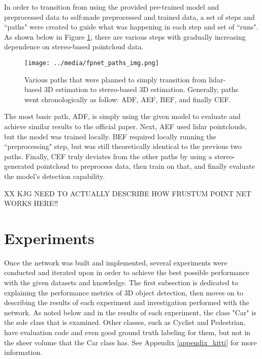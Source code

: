 In order to transition from using the provided pre-trained model and preprocessed data to self-made preprocessed and trained data, a set of steps and ``paths" were created to guide what was happening in each step and set of ``runs". As shown below in Figure \ref{fp_paths}, there are various steps with gradually increasing dependence on stereo-based pointcloud data.

\begin{figure}[H]
    \texttt{[image: ../media/fpnet\_paths\_img.png]}
    \caption{Various paths that were planned to simply transition from lidar-based 3D estimation to stereo-based 3D estimation. Generally, paths went chronologically as follow: ADF, AEF, BEF, and finally CEF.}
    \label{fp_paths}
\end{figure}

The most basic path, ADF, is simply using the given model to evaluate and achieve similar results to the official paper. Next, AEF used lidar pointclouds, but the model was trained locally. BEF required locally running the ``preprocessing" step, but was still theoretically identical to the previous two paths. Finally, CEF truly deviates from the other paths by using a stereo-generated pointcloud to preprocess data, then train on that, and finally evaluate the model's detection capability.

XX KJG NEED TO ACTUALLY DESCRIBE HOW FRUSTUM POINT NET WORKS HERE!!



\newpage
\section{Experiments}
Once the network was built and implemented, several experiments were conducted and iterated upon in order to achieve the best possible performance with the given datasets and knowledge. The first subsection is dedicated to explaining the performance metrics of 3D object detection, then moves on to describing the results of each experiment and investigation performed with the network. As noted below and in the results of each experiment, the class "Car" is the sole class that is examined. Other classes, such as Cyclist and Pedestrian, have evaluation code and even good ground truth labeling for them, but not in the sheer volume that the Car class has. See Appendix \ref{appendix_kitti} for more information.


